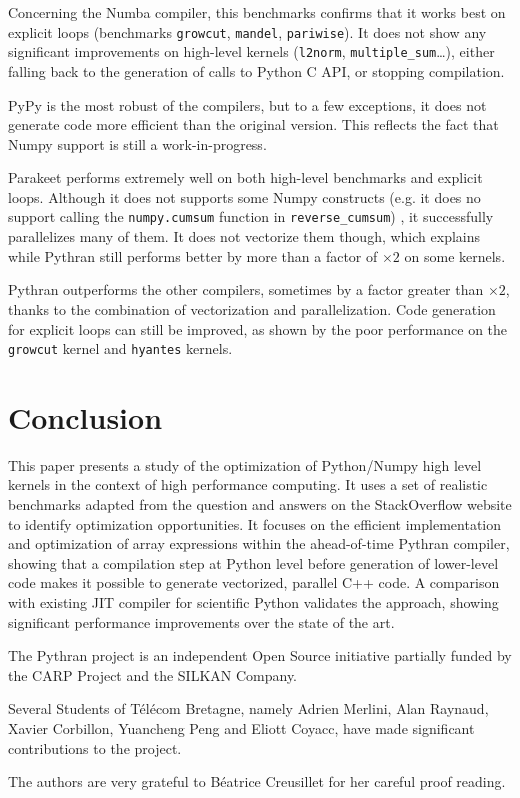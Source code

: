 \documentclass[10pt, preprint]{sigplanconf}
\begin{document}
Concerning the Numba compiler, this benchmarks confirms that it works best on
explicit loops (benchmarks \texttt{growcut}, \texttt{mandel},
\texttt{pariwise}). It does not show any significant improvements on high-level
kernels (\texttt{l2norm}, \texttt{multiple\_sum}\dots), either falling back to
the generation of calls to Python C API, or stopping compilation.

PyPy is the most robust of the compilers, but to a few exceptions, it does not
generate code more efficient than the original version. This reflects the fact
that Numpy support is still a work-in-progress.

Parakeet performs extremely well on both high-level benchmarks and explicit
loops. Although it does not supports some Numpy constructs (e.g. it does no
support calling the \texttt{numpy.cumsum} function in \texttt{reverse\_cumsum})
, it successfully parallelizes many of them. It does not vectorize them though,
which explains while Pythran still performs better by more than a factor of
$\times2$ on some kernels.

Pythran outperforms the other compilers, sometimes by a factor greater than
$\times2$, thanks to the combination of vectorization and parallelization. Code
generation for explicit loops can still be improved, as shown by the poor
performance on the \texttt{growcut} kernel and \texttt{hyantes} kernels.



\section*{Conclusion}

This paper presents a study of the optimization of Python/Numpy high level
kernels in the context of high performance computing. It uses a set of
realistic benchmarks adapted from the question and answers on the StackOverflow
website to identify optimization opportunities. It focuses on the efficient
implementation and optimization of array expressions within the ahead-of-time
Pythran compiler, showing that a compilation step at Python level before
generation of lower-level code makes it possible to generate vectorized,
parallel C++ code. A comparison with existing JIT compiler for scientific
Python validates the approach, showing significant performance improvements
over the state of the art.

\acks

The Pythran project is an independent Open Source initiative partially funded
by the CARP Project and the SILKAN Company.

Several Students of Télécom Bretagne, namely Adrien Merlini, Alan Raynaud,
Xavier Corbillon, Yuancheng Peng and Eliott Coyacc, have made significant
contributions to the project.

The authors are very grateful to Béatrice Creusillet for her careful proof reading.




\end{document}
